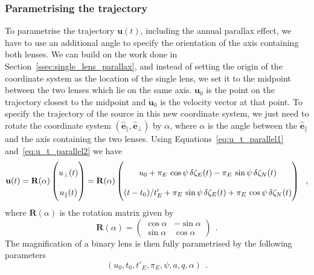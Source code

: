 \documentclass[12pt,dvipsnames]{report}
\newcommand{\hquad}{~~}
\begin{document}
\subsubsection{Parametrising the trajectory}
To parametrise the trajectory $\mathbf u(t)$, including the annual parallax effect,
we have to use an additional angle to specify the orientation of the axis
containing both lenses. We can build on the work done in
Section~\ref{ssec:single_lens_parallax}, and instead of setting the origin
of the coordinate system as the location of the single lens, we set it to
the midpoint between the two lenses which lie on the same axis. $\mathbf u_0$
is the point on the trajectory closest to the midpoint and $\dot{\mathbf
        u}_0$ is the velocity vector at that point. To specify the trajectory of the
source in this new coordinate system, we just need to rotate the coordinate
system $(\hat{\mathbf e}_\parallel, \hat{\mathbf e}_\bot)$ by $\alpha$,
where $\alpha$ is the angle between
the $\hat{\mathbf e}_\parallel$ and the axis containing the two lenses. Using
Equations~\ref{eq:u_t_parallel1} and~\ref{eq:u_t_parallel2} we have
\begin{equation}
    \mathbf u(t)  =
    \mathbf R(\alpha)
    \begin{pmatrix}
        u_\bot (t) \\
        u_\parallel (t)
    \end{pmatrix}
    =
    \mathbf R(\alpha)
    \renewcommand\arraystretch{2}
    \begin{pmatrix}
        u_0 + \pi_E\,\cos\psi\,\delta \zeta_E(t) - \pi_E\,\sin\psi\,\delta \zeta_N(t) \\
        (t-t_0)/t_E' + \pi_E\,\sin\psi\,\delta \zeta_E(t) +
        \pi_E\,\cos\psi\,\delta \zeta_N(t)
    \end{pmatrix}
    \hquad,
\end{equation}
where $\mathbf R (\alpha)$ is the rotation matrix  given by
\begin{equation}
    \mathbf R (\alpha)=
    \begin{pmatrix}
        \cos\alpha & -\sin\alpha \\
        \sin\alpha & \cos\alpha
    \end{pmatrix}
    \hquad.
\end{equation}
The magnification of a binary lens is then fully parametrised by the following parameters
\begin{equation}
    (u_0,t_0,t'_E,\pi_E,\psi, a, q, \alpha)
    \hquad.
\end{equation}
\end{document}
